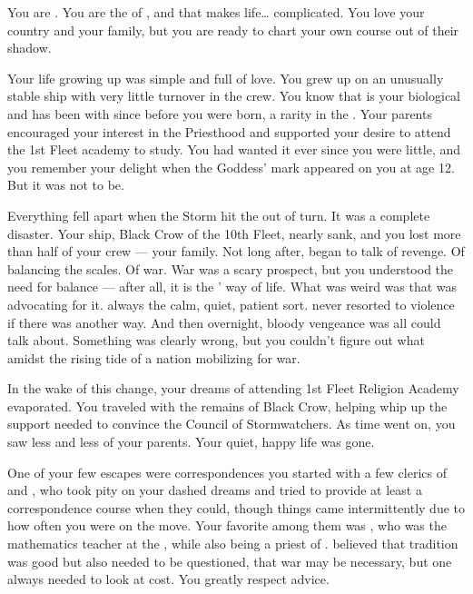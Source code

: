 \documentclass[char]{GL2020}
\begin{document}
\name{\cWarlordDaughter{}}

You are \cWarlordDaughter{\intro}. You are the \cWarlordDaughter{\offspring} of \cLoud{\intro}, and that makes life\ldots{} complicated. You love your country and your family, but you are ready to chart your own course out of their shadow.

Your life growing up was simple and full of love. You grew up on an unusually stable ship with very little turnover in the crew. You know that \cLoud{} is your biological \cLoud{\parent} and has been with \cQuiet{\full} since before you were born, a rarity in the \pShip{}. Your parents encouraged your interest in the Priesthood and supported your desire to attend the 1st Fleet academy to study. You had wanted it ever since you were little, and you remember your delight when the Goddess’ mark appeared on you at age 12. But it was not to be.

Everything fell apart when the Storm hit the \pShip{} out of turn. It was a complete disaster. Your ship, Black Crow of the 10th Fleet, nearly sank, and you lost more than half of your crew — your family. Not long after, \cLoud{} began to talk of revenge. Of balancing the scales. Of war. War was a scary prospect, but you understood the need for balance — after all, it is the \pShippies{}’ way of life. What was weird was that \cLoud{} was advocating for it. \cLoud{\They} \cLoud{\were} always the calm, quiet, patient sort. \cLoud{\They} never resorted to violence if there was another way. And then overnight, bloody vengeance was all \cLoud{\they} could talk about. Something was clearly wrong, but you couldn't figure out what amidst the rising tide of a nation mobilizing for war. 

In the wake of this change, your dreams of attending 1st Fleet Religion Academy evaporated. You traveled with the remains of Black Crow, helping \cLoud{} whip up the support \cLoud{\they} needed to convince the Council of Stormwatchers. As time went on, you saw less and less of your parents. Your quiet, happy life was gone.  

One of your few escapes were correspondences you started with a few clerics of \cEbb{} and \cFlow{}, who took pity on your dashed dreams and tried to provide at least a correspondence course when they could, though things came intermittently due to how often you were on the move. Your favorite among them was \cFlowPriest{\full}, who was the mathematics teacher at the \pSchool{}, while also being a priest of \cFlow{}. \cFlowPriest{\They} believed that tradition was good but also needed to be questioned, that war may be necessary, but one always needed to look at cost. You greatly respect \cFlowPriest{\their} advice. 
\end{document}

